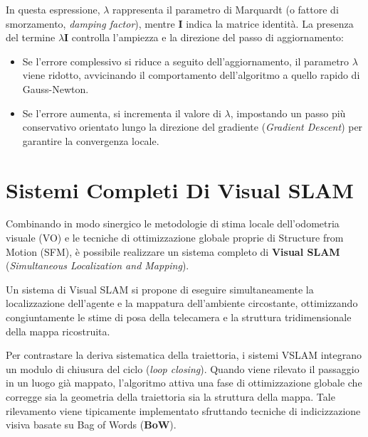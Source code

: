 ﻿\documentclass[11pt, a4paper]{article}
\begin{document}
In questa espressione, $\lambda$ rappresenta il parametro di Marquardt (o fattore di smorzamento, \emph{damping factor}), mentre $\bm{I}$ indica la matrice identità. La presenza del termine $\lambda \bm{I}$ controlla l'ampiezza e la direzione del passo di aggiornamento:
\begin{itemize}
    \item Se l'errore complessivo si riduce a seguito dell'aggiornamento, il parametro $\lambda$ viene ridotto, avvicinando il comportamento dell'algoritmo a quello rapido di Gauss-Newton.
    \item Se l'errore aumenta, si incrementa il valore di $\lambda$, impostando un passo più conservativo orientato lungo la direzione del gradiente (\emph{Gradient Descent}) per garantire la convergenza locale.
\end{itemize}

\newpage

\section{Sistemi Completi Di Visual SLAM}

Combinando in modo sinergico le metodologie di stima locale dell'odometria visuale (VO) e le tecniche di ottimizzazione globale proprie di Structure from Motion (SFM), è possibile realizzare un sistema completo di \textbf{Visual SLAM} (\emph{Simultaneous Localization and Mapping}).

Un sistema di Visual SLAM si propone di eseguire simultaneamente la localizzazione dell'agente e la mappatura dell'ambiente circostante, ottimizzando congiuntamente le stime di posa della telecamera e la struttura tridimensionale della mappa ricostruita.


Per contrastare la deriva sistematica della traiettoria, i sistemi VSLAM integrano un modulo di chiusura del ciclo (\emph{loop closing}). Quando viene rilevato il passaggio in un luogo già mappato, l'algoritmo attiva una fase di ottimizzazione globale che corregge sia la geometria della traiettoria sia la struttura della mappa. Tale rilevamento viene tipicamente implementato sfruttando tecniche di indicizzazione visiva basate su Bag of Words (\textbf{BoW}).

\end{document}

